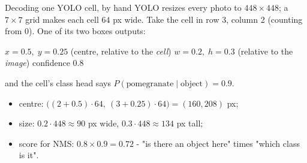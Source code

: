 \documentclass[aspectratio=169]{beamer}
\begin{document}
\begin{frame}{Decoding one YOLO cell, by hand}
  \small
  YOLO resizes every photo to $448\times448$; a $7\times7$ grid makes each cell $64$ px
  wide. Take the cell in row 3, column 2 (counting from 0). One of its two boxes outputs:
  \vskip 3pt
  \begin{center}
    $x = 0.5,\; y = 0.25$ {\footnotesize (centre, relative to the \emph{cell})}\quad
    $w = 0.2,\; h = 0.3$ {\footnotesize (relative to the \emph{image})}\quad
    confidence $0.8$
  \end{center}
  and the cell's class head says $P(\text{pomegranate} \mid \text{object}) = 0.9$.
  \vskip 4pt
  \begin{itemize}
    \item centre: $\big((2 + 0.5)\cdot 64,\ (3 + 0.25)\cdot 64\big) = (160, 208)$ px;
    \item size: $0.2 \cdot 448 \approx 90$ px wide, $0.3 \cdot 448 \approx 134$ px tall;
    \item score for NMS: $0.8 \times 0.9 = \mathbf{0.72}$ - "is there an object here"
      times "which class is it".
  \end{itemize}
  \vskip 4pt
\end{frame}
\end{document}
